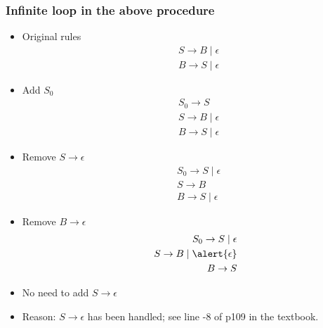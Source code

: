  \begin{frame}[allowframebreaks] \frametitle{Infinite loop in the above procedure}

  \begin{itemize}
\item Original rules
  \begin{eqnarray*}
    && S \rightarrow B \mid \epsilon\\
&& B \rightarrow S \mid \epsilon
  \end{eqnarray*}

\item Add $S_0$
  \begin{eqnarray*}
&& S_0 \rightarrow S\\
&& S \rightarrow B \mid \epsilon\\
&& B \rightarrow S \mid \epsilon
  \end{eqnarray*}

\item Remove $S \rightarrow \epsilon$
  \begin{eqnarray*}
&& S_0 \rightarrow S \mid \epsilon\\
&& S \rightarrow B \\
&& B \rightarrow S \mid \epsilon
  \end{eqnarray*}

\item Remove $B \rightarrow \epsilon$
  \begin{eqnarray*}
&& S_0 \rightarrow S \mid \epsilon\\
&& S \rightarrow B \mid \alert{\epsilon} \\
&& B \rightarrow S 
  \end{eqnarray*}

\item No need to add $S \rightarrow \epsilon$
\item Reason: $S \rightarrow \epsilon$ has been
handled; see line -8 of p109 in the textbook.

\end{itemize}\end{frame}



